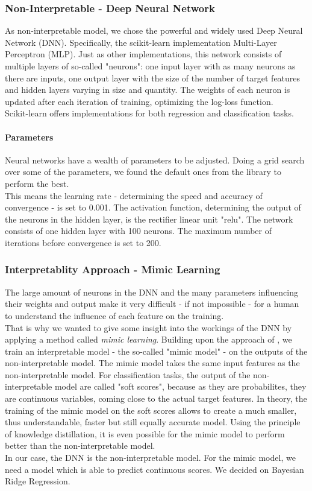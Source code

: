 \documentclass[conference,comsoc]{IEEEtran}
\begin{document}
\subsubsection{Non-Interpretable - Deep Neural Network}
As non-interpretable model, we chose the powerful and widely used Deep Neural Network (DNN). 
Specifically, the scikit-learn implementation Multi-Layer Perceptron (MLP). 
Just as other implementations, this network consists of multiple layers of so-called "neurons": one input layer with as many neurons as there are inputs, one output layer with the size of the number of target features and hidden layers varying in size and quantity. 
The weights of each neuron is updated after each iteration of training, optimizing the log-loss function. \\
Scikit-learn offers implementations for both regression and classification tasks.
\paragraph{Parameters}
Neural networks have a wealth of parameters to be adjusted. 
Doing a grid search over some of the parameters, we found the default ones from the library to perform the best.\\
This means the learning rate - determining the speed and accuracy of convergence - is set to 0.001. 
The activation function, determining the output of the neurons in the hidden layer, is the rectifier linear unit "relu". 
The network consists of one hidden layer with 100 neurons. 
The maximum number of iterations before convergence is set to 200.

\subsubsection{Interpretablity Approach - Mimic Learning}
The large amount of neurons in the DNN and the many parameters influencing their weights and output make it very difficult - if not impossible - for a human to understand the influence of each feature on the training. \\
That is why we wanted to give some insight into the workings of the DNN by applying a method called \emph{mimic learning}. 
Building upon the approach of \cite{Che2016}, we train an interpretable model - the so-called "mimic model" - on the outputs of the non-interpretable model.
The mimic model takes the same input features as the non-interpretable model.
For classification tasks, the output of the non-interpretable model are called "soft scores", because as they are probabilites, they are continuous variables, coming close to the actual target features.
In theory, the training of the mimic model on the soft scores allows to create a much smaller, thus understandable, faster but still equally accurate model.
Using the principle of knowledge distillation, it is even possible for the mimic model to perform better than the non-interpretable model. \\
In our case, the DNN is the non-interpretable model.
For the mimic model, we need a model which is able to predict continuous scores.
We decided on Bayesian Ridge Regression.
\end{document}
